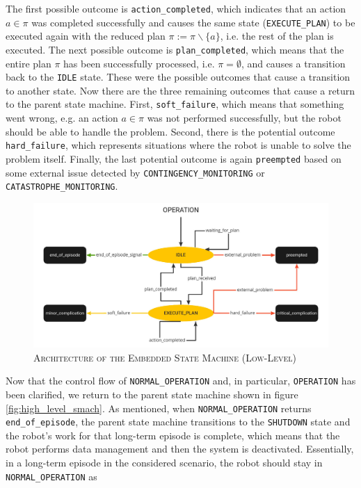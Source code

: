 \documentclass[english, master, utf8]{base/thesis_KBS}
\newcommand{\code}[1]{\colorbox{light-gray}{\texttt{#1}}}
\begin{document}
The first possible outcome is \code{action\_completed}, which indicates that an action $a \in \pi$  was completed successfully and causes the same state (\code{EXECUTE\_PLAN}) to be
executed again with the reduced plan $\pi := \pi \backslash \{a\}$, i.e. the rest of the plan is executed. The next possible outcome is \code{plan\_completed}, which means that the entire
plan $\pi$ has been successfully processed, i.e. $\pi = \emptyset$, and causes a transition back to the \code{IDLE} state.
These were the possible outcomes that cause a transition to another state. Now there are the three remaining outcomes that cause a return to the parent state machine. 
First, \code{soft\_failure}, which means that something went wrong, e.g. an action $a \in \pi$ was not performed successfully, but the robot should be able to handle the problem. 
Second, there is the potential outcome \code{hard\_failure}, which represents situations where the robot is unable to solve the problem itself.
Finally, the last potential outcome is again \code{preempted} based on some external issue detected by \code{CONTINGENCY\_MONITORING} or \code{CATASTROPHE\_MONITORING}.
\begin{figure}[H]
    \centering
    \includegraphics[width=\textwidth]{pics/SMACH_low_level.jpg}
    \caption{\textsc{Architecture of the Embedded State Machine (Low-Level)}}
    \label{fig:low_level_smach}
\end{figure}
\noindent
Now that the control flow of \code{NORMAL\_OPERATION} and, in particular, \code{OPERATION} has been clarified, we return to the parent state machine shown 
in figure \ref{fig:high_level_smach}.
As mentioned, when \code{NORMAL\_OPERATION} returns \code{end\_of\_episode}, the parent state machine transitions to the \code{SHUTDOWN} state and the 
robot's work for that long-term episode is complete, which means that the robot performs data management and then the system is deactivated.
Essentially, in a long-term episode in the considered scenario, the robot should stay in \code{NORMAL\_OPERATION} as 
\end{document}
